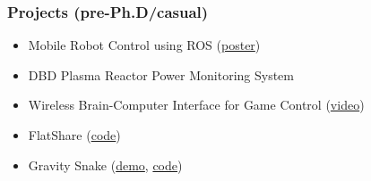 \documentclass[11pt, a4paper]{article}
\providecommand{\tightlist}{%
  \setlength{\itemsep}{0pt}\setlength{\parskip}{0pt}}
\begin{document}
\begin{raggedright}
\subsubsection{Projects (pre-Ph.D/casual)}

\begin{itemize}
\tightlist
\item
  Mobile Robot Control using ROS
  (\href{./assets/images/fyp.png}{poster})
\item
  DBD Plasma Reactor Power Monitoring System
\item
  Wireless Brain-Computer Interface for Game Control
  (\href{https://www.youtube.com/watch?v=ysmLmQ8NfEY}{video})
\item
  FlatShare (\href{https://github.com/xukai92/flatshare}{code})
\item
  Gravity Snake (\href{http://xuk.ai/gravity_snake/}{demo},
  \href{https://github.com/xukai92/gravity_snake}{code})
\end{itemize}
\end{raggedright}
\end{document}
